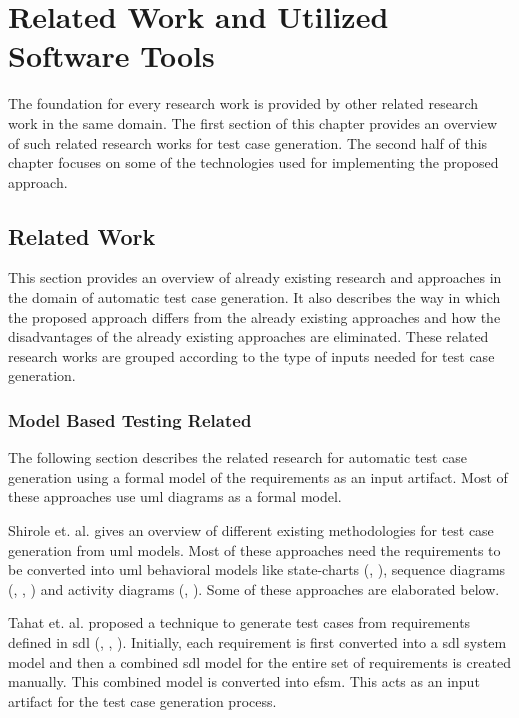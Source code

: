 
\chapter{Related Work and Utilized Software Tools}\label{relatedwork} 
The foundation for every research work is provided by other related research work in the same domain. The first section of this chapter provides an overview of such related research works for test case generation. The second half of this chapter focuses on some of the technologies used for implementing the proposed approach.

\section{Related Work}
This section provides an overview of already existing research and approaches in the domain of automatic test case generation. It also describes the way in which the proposed approach differs from the already existing approaches and how the disadvantages of the already existing approaches are eliminated. These related research works are grouped according to the type of inputs needed for test case generation. 
 
\subsection{Model Based Testing Related}
The following section describes the related research for automatic test case generation using a formal model of the requirements as an input artifact. Most of these approaches use \gls{uml} diagrams as a formal model.

Shirole et. al. \cite{shirole2013uml} gives an overview of different existing methodologies for test case generation from \gls{uml} models. Most of these approaches need the requirements to be converted into \gls{uml} behavioral models like state-charts (\cite{ryser1999scenario}, \cite{bandyopadhyay2009test}), sequence diagrams (\cite{nebut2003requirements}, \cite{linzhang2004generating}, \cite{briand2002uml}) and activity diagrams (\cite{nebut2006automatic}, \cite{nayak2012synthesis}).  Some of these approaches are elaborated below.

Tahat et. al. \cite{tahat2001requirement} proposed a technique to generate test cases from requirements defined in \gls{sdl} (\cite{algayres2012goal}, \cite{bochmann1997automating}, \cite{bromstrup1995tesdl}). Initially, each requirement is first converted into a \gls{sdl} system model and then a combined \gls{sdl} model for the entire set of requirements is created manually. This combined model is converted into \gls{efsm}. This acts as an input artifact for the test case generation process.

